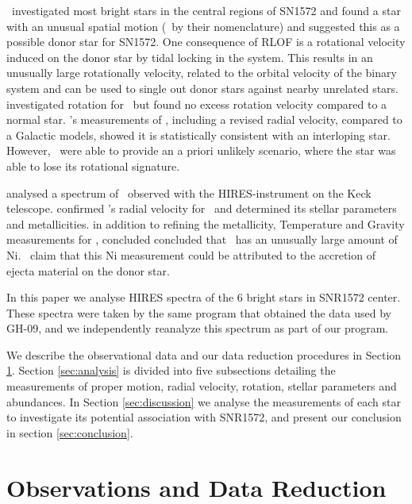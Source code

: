 \rl\ investigated most bright stars in the central regions of SN1572 and found a star with an unusual spatial motion (\starg\ by their nomenclature) and suggested this as a possible donor star for SN1572. 
One consequence of RLOF is a rotational velocity induced on the donor star by tidal locking in the system. This results in an unusually large rotationally velocity, related to the orbital velocity of the binary system and can be used to single out donor stars against nearby unrelated stars. \citep[][,henceforth \wek]{2009ApJ...701.1665K} investigated rotation for  \starg\ but found no excess rotation velocity compared to a normal star. \wek's measurements of \starg, including a revised radial velocity, compared to a Galactic models, showed it is statistically consistent with an interloping star. However, \wek\ were able to provide an a priori unlikely scenario, where the star was able to lose its rotational signature. 

\citet[henceforth \gh]{2009ApJ...691....1H} analysed a spectrum of \starg\ observed with the HIRES-instrument on the Keck telescope. \gh confirmed \wek's radial velocity for \starg\ and determined its stellar parameters and metallicities. \gh in addition to refining the metallicity, Temperature and Gravity measurements for \starg, concluded concluded that \starg\ has an unusually large amount of Ni. \gh\ claim that this Ni measurement could be attributed to the accretion of ejecta material on the donor star. 

In this paper we analyse HIRES spectra of the 6 bright stars in SNR1572 center. These spectra were taken by the same program that obtained the data used by GH-09, and we independently reanalyze this spectrum as part of our program.

We describe the observational data and our data reduction procedures in Section \ref{sec:observ-data-reduct}. Section \ref{sec:analysis} is divided into five subsections detailing the measurements of proper motion, radial velocity, rotation, stellar parameters and abundances. In Section \ref{sec:discussion} we analyse the measurements of each star to investigate its potential association with SNR1572, and present our conclusion in section \ref{sec:conclusion}.

\section{Observations and Data Reduction}
\label{sec:observ-data-reduct}

